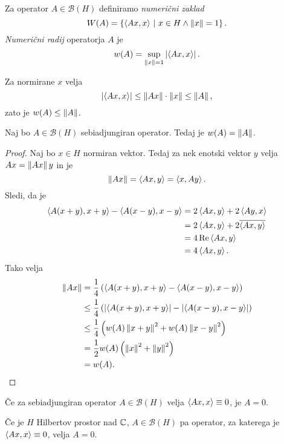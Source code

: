 \begin{definicija}
Za operator $A \in \mathcal{B}(H)$ definiramo
\emph{numerični zaklad}
\[
W(A) = \setb{\skl{Ax,x}}{x \in H \land \norm{x} = 1}.
\]
\emph{Numerični radij} operatorja $A$ je
\[
w(A) = \sup_{\norm{x} = 1} \abs{\skl{Ax,x}}.
\]
\end{definicija}

\begin{opomba}
Za normirane $x$ velja
\[
\abs{\skl{Ax,x}} \leq \norm{Ax} \cdot \norm{x} \leq \norm{A},
\]
zato je $w(A) \leq \norm{A}$.
\end{opomba}

\begin{trditev}
Naj bo $A \in \mathcal{B}(H)$ sebiadjungiran operator. Tedaj je
$w(A) = \norm{A}$.
\end{trditev}

\begin{proof}
Naj bo $x \in H$ normiran vektor. Tedaj za nek enotski vektor $y$
velja $Ax = \norm{Ax}y$ in je
\[
\norm{Ax} = \skl{Ax,y} = \skl{x,Ay}.
\]
Sledi, da je
\begin{align*}
\skl{A(x+y),x+y} - \skl{A(x-y),x-y} &=
2\skl{Ax,y} + 2\skl{Ay,x}
\\
&=
2 \skl{Ax,y} + 2 \oline{\skl{Ax,y}}
\\
&=
4 \Re \skl{Ax,y}
\\
&= 4 \skl{Ax,y}.
\end{align*}
Tako velja
\begin{align*}
\norm{Ax} &=
\frac{1}{4} \br{\skl{A(x+y),x+y} - \skl{A(x-y),x-y}}
\\
&\leq
\frac{1}{4} \br{\abs{\skl{A(x+y),x+y}} - \abs{\skl{A(x-y),x-y}}}
\\
&\leq
\frac{1}{4} \br{w(A) \norm{x+y}^2 + w(A) \norm{x-y}^2}
\\
&=
\frac{1}{2} w(A) \br{\norm{x}^2 + \norm{y}^2}
\\
&=
w(A). \qedhere
\end{align*}
\end{proof}

\begin{posledica}
Če za sebiadjungiran operator $A \in \mathcal{B}(H)$ velja
$\skl{Ax,x} \equiv 0$, je $A = 0$.
\end{posledica}

\begin{posledica}
Če je $H$ Hilbertov prostor nad $\C$, $A \in \mathcal{B}(H)$ pa
operator, za katerega je $\skl{Ax,x} \equiv 0$, velja $A = 0$.
\end{posledica}

